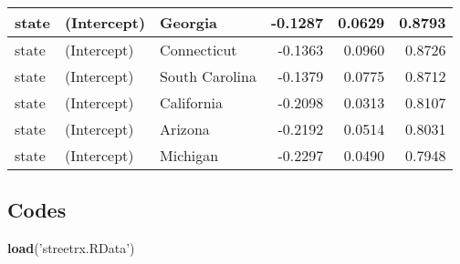 \documentclass[
  11pt,
]{article}
\newenvironment{Shaded}{\begin{snugshade}}{\end{snugshade}}
\newcommand{\DataTypeTok}[1]{\textcolor[rgb]{0.13,0.29,0.53}{#1}}
\newcommand{\KeywordTok}[1]{\textcolor[rgb]{0.13,0.29,0.53}{\textbf{#1}}}
\newcommand{\NormalTok}[1]{#1}
\newcommand{\OperatorTok}[1]{\textcolor[rgb]{0.81,0.36,0.00}{\textbf{#1}}}
\newcommand{\OtherTok}[1]{\textcolor[rgb]{0.56,0.35,0.01}{#1}}
\newcommand{\StringTok}[1]{\textcolor[rgb]{0.31,0.60,0.02}{#1}}
\begin{document}
\begin{longtable}[t]{l|l|l|r|r|r}
\hline
state & (Intercept) & Georgia & -0.1287 & 0.0629 & 0.8793\\
\hline
state & (Intercept) & Connecticut & -0.1363 & 0.0960 & 0.8726\\
\hline
state & (Intercept) & South Carolina & -0.1379 & 0.0775 & 0.8712\\
\hline
state & (Intercept) & California & -0.2098 & 0.0313 & 0.8107\\
\hline
state & (Intercept) & Arizona & -0.2192 & 0.0514 & 0.8031\\
\hline
state & (Intercept) & Michigan & -0.2297 & 0.0490 & 0.7948\\
\hline
\end{longtable}

\newpage

\hypertarget{codes}{%
\subsection{Codes}\label{codes}}

\begin{Shaded}
\end{Shaded}

\begin{Shaded}
\begin{Highlighting}[]
\KeywordTok{load}\NormalTok{(}\StringTok{'streetrx.RData'}\NormalTok{)}
\end{Highlighting}
\end{Shaded}
\end{document}
